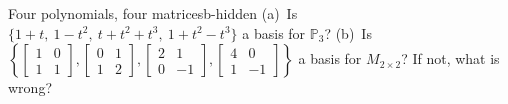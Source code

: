 \documentclass[11pt]{article}
\begin{document}
\begin{exmp}{Four polynomials, four matrices}{b-hidden}
(a)~Is $\{1+t,\ 1-t^2,\ t+t^2+t^3,\ 1+t^2-t^3\}$ a basis for $\mathbb{P}_3$? (b)~Is $\left\{\begin{bmatrix}1&0\\1&1\end{bmatrix},\begin{bmatrix}0&1\\1&2\end{bmatrix},\begin{bmatrix}2&1\\0&-1\end{bmatrix},\begin{bmatrix}4&0\\1&-1\end{bmatrix}\right\}$ a basis for $M_{2\times2}$? If not, what is wrong?


\end{exmp}
\end{document}

